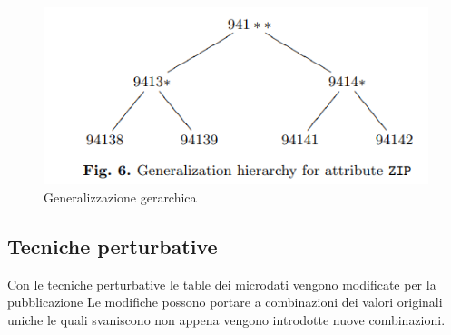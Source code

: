 \begin{itemize}
    \begin{figure}[h]
        \centering
        \includegraphics[width=0.5\linewidth]{paper_microdata/Fig6.png}
        \caption{Generalizzazione gerarchica}
        \label{fig:Fig-6}
    \end{figure}
\end{itemize}

\subsection{Tecniche perturbative}
Con le tecniche perturbative le table dei microdati vengono modificate per la pubblicazione
Le modifiche possono portare a combinazioni dei valori originali uniche le quali svaniscono non appena vengono introdotte nuove combinazioni.
